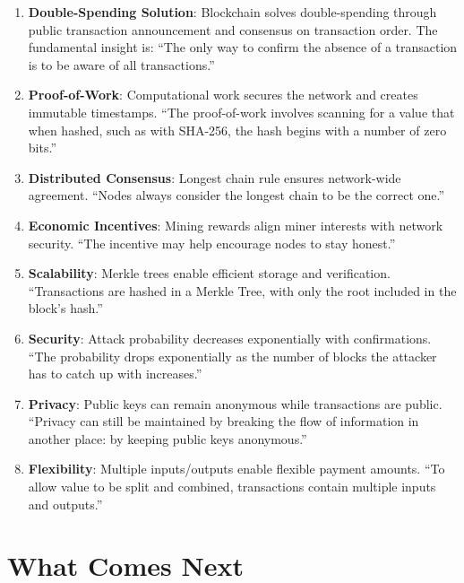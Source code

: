 \begin{enumerate}
  \item \textbf{Double-Spending Solution}: Blockchain solves double-spending through public transaction announcement and consensus on transaction order. The fundamental insight is: ``The only way to confirm the absence of a transaction is to be aware of all transactions.''

  \item \textbf{Proof-of-Work}: Computational work secures the network and creates immutable timestamps. ``The proof-of-work involves scanning for a value that when hashed, such as with SHA-256, the hash begins with a number of zero bits.''

  \item \textbf{Distributed Consensus}: Longest chain rule ensures network-wide agreement. ``Nodes always consider the longest chain to be the correct one.''

  \item \textbf{Economic Incentives}: Mining rewards align miner interests with network security. ``The incentive may help encourage nodes to stay honest.''

  \item \textbf{Scalability}: Merkle trees enable efficient storage and verification. ``Transactions are hashed in a Merkle Tree, with only the root included in the block's hash.''

  \item \textbf{Security}: Attack probability decreases exponentially with confirmations. ``The probability drops exponentially as the number of blocks the attacker has to catch up with increases.''

  \needspace{2.5in}
  \item \textbf{Privacy}: Public keys can remain anonymous while transactions are public. ``Privacy can still be maintained by breaking the flow of information in another place: by keeping public keys anonymous.''

  \item \textbf{Flexibility}: Multiple inputs/outputs enable flexible payment amounts. ``To allow value to be split and combined, transactions contain multiple inputs and outputs.''
\end{enumerate}

\section{What Comes Next}
\label{sec:ch03-what-next}

